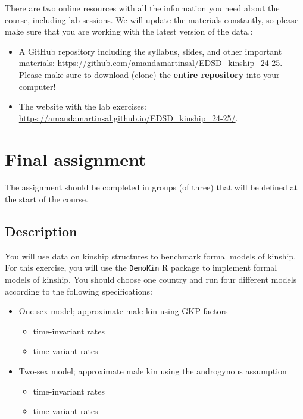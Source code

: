 ﻿\documentclass{article}
\begin{document}
There are two online resources with all the information you need about the course, including lab sessions. We will update the materials constantly, so please make sure that you are working with the latest version of the data.:

\begin{itemize}
    \item A GitHub repository including the syllabus, slides, and other important materials: \url{https://github.com/amandamartinsal/EDSD_kinship_24-25}. Please make sure to download (clone) the \textbf{entire repository} into your computer!
    \item The website with the lab exercises: \url{https://amandamartinsal.github.io/EDSD_kinship_24-25/}.
\end{itemize}

\section{Final assignment}
\label{sec:assignment}

The assignment should be completed in groups (of three) that will be defined at the start of the course.

\subsection{Description}

You will use data on kinship structures to benchmark formal models of kinship.
For this exercise, you will use the \texttt{DemoKin} R package to implement formal models of kinship. 
You should choose one country and run four different models according to the following specifications:

    \begin{itemize}
        \item One-sex model; approximate male kin using GKP factors
       \begin{itemize}
           \item time-invariant rates
           \item time-variant rates
       \end{itemize}  
        
        \item Two-sex model; approximate male kin using the androgynous assumption
         \begin{itemize}
           \item time-invariant rates
           \item time-variant rates
             \end{itemize}  
     \end{itemize}
\end{document}
